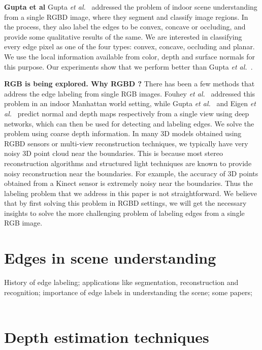 \textbf{Gupta et al}
Gupta \textit{et al.}~\cite{gupta13Perceptual} addressed the problem of indoor scene understanding
from a single RGBD image, where they segment and classify image regions. In the process, they also 
label the edges to be convex, concave or occluding, and provide some qualitative results of the same. 
We are interested in classifying every edge pixel as one of the four types: convex, concave,
occluding and planar. We use the local information available from color, depth and surface
normals for this purpose. Our experiments show that we perform better than 
Gupta \textit{et al.}~\cite{gupta13Perceptual}.

\textbf{RGB is being explored. Why RGBD ?}
There has been a few methods that address the edge labeling from single RGB images. 
Fouhey \textit{et al.}~\cite{Fouhey14c} addressed this problem in an indoor Manhattan world setting, 
while Gupta \textit{et al.}~\cite{Fouhey14c} and Eigen \textit{et al.}~\cite{Eigen2014} predict normal 
and depth maps respectively from a single view using deep networks, which can then be used for 
detecting and labeling edges. 
We solve the problem using coarse depth information. In many 3D models obtained using RGBD sensors 
or multi-view reconstruction techniques, we typically have very noisy 3D point cloud near the 
boundaries. This is because most stereo reconstruction algorithms and structured light techniques 
are known to provide noisy reconstruction near the boundaries. For example, the accuracy of 3D 
points obtained from a Kinect sensor is extremely noisy near the boundaries. Thus the labeling 
problem that we address in this paper is not straightforward. We believe 
that by first solving this problem in RGBD settings, we will get the necessary insights to 
solve the more challenging problem of labeling edges from a single RGB image.

\section{Edges in scene understanding} 
\label{sec:SECTION1NAME}
History of edge labeling; applications like segmentation, reconstruction and recognition; importance of edge labels in understanding the scene; some papers; \\
~\cite{3dFromSingleView}
\section{Depth estimation techniques} 
\label{sec:SECTION2NAME}


